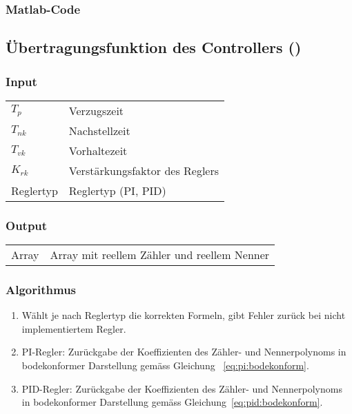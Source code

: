 \subsubsection*{Matlab-Code}



\clearpage
\subsection{\"Ubertragungsfunktion des Controllers ()}
\label{app:algo:utfcontroller}

\subsubsection*{Input}

\begin{tabular}{p{40mm}l}
    $ T_p $        & Verzugszeit \\
    $ T_{nk} $     & Nachstellzeit \\
    $ T_{vk} $     & Vorhaltezeit \\
    $ K_{rk} $     & Verst\"arkungsfaktor des Reglers \\
      Reglertyp    & Reglertyp (PI, PID)
\end{tabular}

\subsubsection*{Output}
\begin{tabular}{p{40mm}l}
    Array & Array mit reellem Z\"ahler und reellem Nenner
\end{tabular}

\subsubsection*{Algorithmus}
\begin{enumerate}
    \item
        W\"ahlt je nach Reglertyp die  korrekten Formeln, gibt Fehler zur\"uck
        bei nicht implementiertem Regler.
    \item
        PI-Regler: Zur\"uckgabe der Koeffizienten des Z\"ahler- und Nennerpolynoms
        in bodekonformer Darstellung gem\"ass Gleichung ~\ref{eq:pi:bodekonform}.
    \item
        PID-Regler: Zur\"uckgabe der Koeffizienten des Z\"ahler- und Nennerpolynoms
        in bodekonformer Darstellung gem\"ass Gleichung~\ref{eq:pid:bodekonform}.
\end{enumerate}


